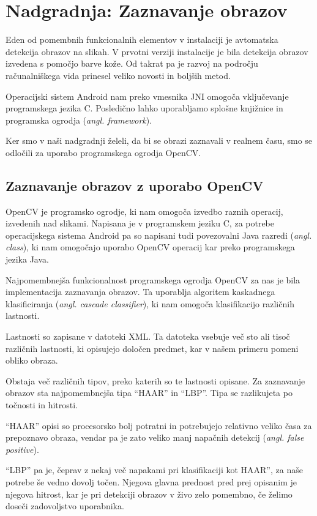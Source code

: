 \chapter{Nadgradnja: Zaznavanje obrazov}
\label{ch:zaznavanjeObrazov}
Eden od pomembnih funkcionalnih elementov v instalaciji je avtomatska detekcija  obrazov na slikah. V prvotni verziji instalacije je bila detekcija obrazov izvedena s pomočjo barve kože. Od takrat pa je razvoj na področju računalniškega vida prinesel veliko novosti in boljših metod.

Operacijski sistem Android nam preko vmesnika JNI omogoča vključevanje
programskega jezika C. Posledično lahko uporabljamo splošne knjižnice in
programska ogrodja (\textit{angl. framework}).

Ker smo v naši nadgradnji želeli, da bi se obrazi zaznavali v realnem času,
smo se odločili za uporabo programskega ogrodja OpenCV.


\section{Zaznavanje obrazov z uporabo OpenCV}
\label{sec:zaznavanjeObrazovOpenCV}
OpenCV je programsko ogrodje, ki nam omogoča izvedbo raznih operacij,
izvedenih nad slikami. Napisana je v programskem jeziku C, za potrebe
operacijskega sistema Android pa so napisani tudi povezovalni Java razredi
(\textit{angl. class}), ki nam omogočajo uporabo OpenCV operacij kar preko
programskega jezika Java.

Najpomembnejša funkcionalnost programskega ogrodja OpenCV za nas je bila
implementacija zaznavanja obrazov. Ta uporablja algoritem kaskadnega
klasificiranja (\textit{angl. cascade classifier}), ki nam omogoča
klasifikacijo različnih lastnosti.

Lastnosti so zapisane v datoteki XML. Ta datoteka vsebuje več sto ali tisoč
različnih lastnosti, ki opisujejo določen predmet, kar v našem primeru pomeni
obliko obraza.

Obstaja več različnih tipov, preko katerih so te lastnosti opisane. Za
zaznavanje obrazov sta najpomembnejša tipa ``HAAR'' in ``LBP''. Tipa se
razlikujeta po točnosti in hitrosti.

``HAAR'' opisi so procesorsko bolj potratni in potrebujejo relativno veliko
časa za prepoznavo obraza, vendar pa je zato veliko manj napačnih detekcij
(\textit{angl. false positive}).

``LBP'' pa je, čeprav z nekaj več napakami pri klasifikaciji kot HAAR'', za
naše potrebe še vedno dovolj točen. Njegova glavna prednost pred prej
opisanim je  njegova hitrost, kar je pri detekciji obrazov v živo zelo
pomembno, če želimo doseči zadovoljstvo uporabnika.

